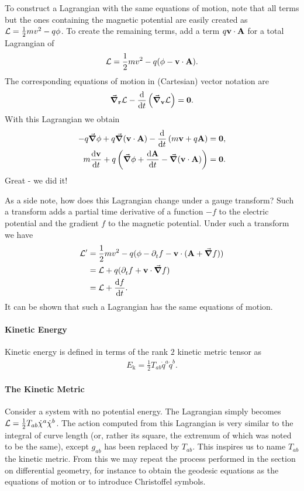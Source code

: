 To construct a Lagrangian with the same equations of motion, note that all terms but the ones containing the magnetic potential are easily created as $\mathcal{L} = \frac{1}{2}mv^{2} - q\phi$. To create the remaining terms, add a term $q\vb{v}\cdot\vb{A}$ for a total Lagrangian of
\begin{align*}
	\mathcal{L} = \frac{1}{2}mv^{2} - q(\phi - \vb{v}\cdot\vb{A}).
\end{align*}
The corresponding equations of motion in (Cartesian) vector notation are
\begin{align*}
	\grad_{\vb{r}}{\mathcal{L}} - \dv{t}\left(\grad_{\vb{v}}{\mathcal{L}}\right) = \vb{0}.
\end{align*}
With this Lagrangian we obtain
\begin{align*}
	-q\grad{\phi} + q\grad{(\vb{v}\cdot\vb{A})} - \dv{t}\left(m\vb{v} + q\vb{A}\right) = \vb{0}, \\
	m\dv{\vb{v}}{t} + q\left(\grad{\phi} + \dv{\vb{A}}{t} - \grad{(\vb{v}\cdot\vb{A})}\right) = \vb{0}.
\end{align*}
Great - we did it!

As a side note, how does this Lagrangian change under a gauge transform? Such a transform adds a partial time derivative of a function $-f$ to the electric potential and the gradient $f$ to the magnetic potential. Under such a transform we have
\begin{align*}
	\mathcal{L}^{\prime} &= \frac{1}{2}mv^{2} - q(\phi - \partial^{}_{t}f  - \vb{v}\cdot(\vb{A} + \grad{f})) \\
	              &= \mathcal{L} + q(\partial^{}_{t}f + \vb{v}\cdot\grad{f}) \\
	              &= \mathcal{L} + \dv{f}{t}.
\end{align*}
It can be shown that such a Lagrangian has the same equations of motion.

\paragraph{Kinetic Energy}
Kinetic energy is defined in terms of the rank $2$ kinetic metric tensor as
\begin{align*}
	E_{\text{k}} = \frac{1}{2}T_{ab}\dot{q}^{a}\dot{q}^{b}.
\end{align*}

\paragraph{The Kinetic Metric}
Consider a system with no potential energy. The Lagrangian simply becomes $\mathcal{L} = \frac{1}{2}T_{ab}\dot{\chi}^{a}\dot{\chi}^{b}$. The action computed from this Lagrangian is very similar to the integral of curve length (or, rather its square, the extremum of which was noted to be the same), except $g_{ab}$ has been replaced by $T_{ab}$. This inspires us to name $T_{ab}$ the kinetic metric. From this we may repeat the process performed in the section on differential geometry, for instance to obtain the geodesic equations as the equations of motion or to introduce Christoffel symbols.

